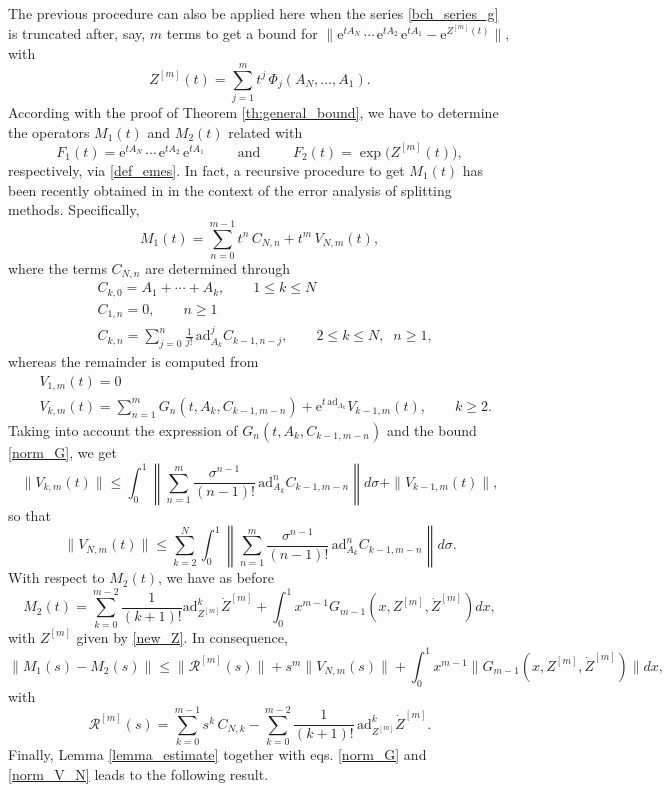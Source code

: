 \documentclass[11pt]{article}
\newcommand{\e}{\ensuremath{\mathrm{e}}}
\newcommand{\ad}{\ensuremath{\mathrm{ad}}}
\begin{document}
The previous procedure can also be applied here when the series \eqref{bch_series_g} is truncated after, say, $m$ terms to get 
 a bound for $\| \e^{t A_N} \, \cdots \, \e^{t A_2} \, \e^{t A_1} - \e^{Z^{[m]}(t)} \|$, with
\begin{equation} \label{new_Z}
  Z^{[m]}(t) = \sum_{j=1}^m t^j \, \Phi_j(A_N, \ldots, A_1).
\end{equation}  
According with the proof of Theorem \ref{th:general_bound}, we have to determine the operators $M_1(t)$ and $M_2(t)$ related with
\[
  F_1(t) =  \e^{t A_N} \, \cdots \, \e^{t A_2} \, \e^{t A_1}  \qquad \mbox{ and } \qquad F_2(t) = \exp \big(Z^{[m]}(t) \big),
\]
respectively, via \eqref{def_emes}. In fact, a recursive procedure to get  $M_1(t)$ has been recently obtained in \cite{casas26ebf} in the context
of the error analysis of splitting methods. Specifically,
\[
 M_1(t) =  \sum_{n=0}^{m-1} t^n \, C_{N,n} + t^m \, V_{N,m}(t),
\]
where the terms $C_{N,n}$ are determined through  
\begin{equation} \label{recur_C}
\begin{aligned}
 & C_{k,0} = A_1 + \cdots + A_k, \qquad 1 \le k \le N \\
 & C_{1,n} = 0, \qquad n \ge 1 \\
 & C_{k,n} = \sum_{j=0}^n \frac{1}{j!} \,\ad_{A_k}^j C_{k-1, n-j},\qquad 2 \le k \le N, \;\; n\geq 1,
\end{aligned}
\end{equation}
whereas the remainder is computed from
\[
\begin{aligned}
  & V_{1,m}(t) = 0 \\
  & V_{k,m}(t) = \sum_{n=1}^m G_n(t, A_k, C_{k-1,m-n}) + \e^{t \, \ad_{A_k}} V_{k-1,m}(t), \qquad k \ge 2.
\end{aligned}
\]  
Taking into account the expression of $G_n(t, A_k, C_{k-1,m-n})$ and the bound \eqref{norm_G}, we get
\[
  \| V_{k,m}(t) \| \le  \int_0^1 \left\| \sum_{n=1}^m \frac{\sigma^{n-1}}{(n-1)!} \, \ad_{A_k}^n C_{k-1,m-n}  \right\| d \sigma+ \|V_{k-1,m}(t)\|,
\]  
so that
\begin{equation} \label{norm_V_N}
   \| V_{N,m}(t) \| \le \sum_{k=2}^N   \int_0^1 \left\| \sum_{n=1}^m \frac{\sigma^{n-1}}{(n-1)!} \, \ad_{A_k}^n C_{k-1,m-n}  \right\| d \sigma.
\end{equation}   
With respect to $M_2(t)$, we have as before
\[
  M_2(t) =  \sum_{k=0}^{m-2} \frac{1}{(k+1)!} \ad_{Z^{[m]}}^k \dot{Z}^{[m]} + \int_0^1 x^{m-1} G_{m-1}(x,Z^{[m]},  \dot{Z}^{[m]}) dx,
\]
with $Z^{[m]}$  given by \eqref{new_Z}. In consequence,
\[
  \| M_1(s) - M_2(s)\| \le \|\mathcal{R}^{[m]}(s)\| + s^m \|V_{N,m}(s)\| + \int_0^1 x^{m-1} \| G_{m-1}(x,Z^{[m]},  \dot{Z}^{[m]})\| dx,
\]
with
\begin{equation} \label{def_r_2}
      \mathcal{R}^{[m]}(s) =  \sum_{k=0}^{m-1} s^k \, C_{N,k} - \sum_{k=0}^{m-2} \frac{1}{(k+1)!} \, \ad_{Z^{[m]}}^k \dot{Z}^{[m]}.
\end{equation}      
Finally, Lemma \ref{lemma_estimate} together with eqs. \eqref{norm_G} and  \eqref{norm_V_N} leads to the following result.
\end{document}
